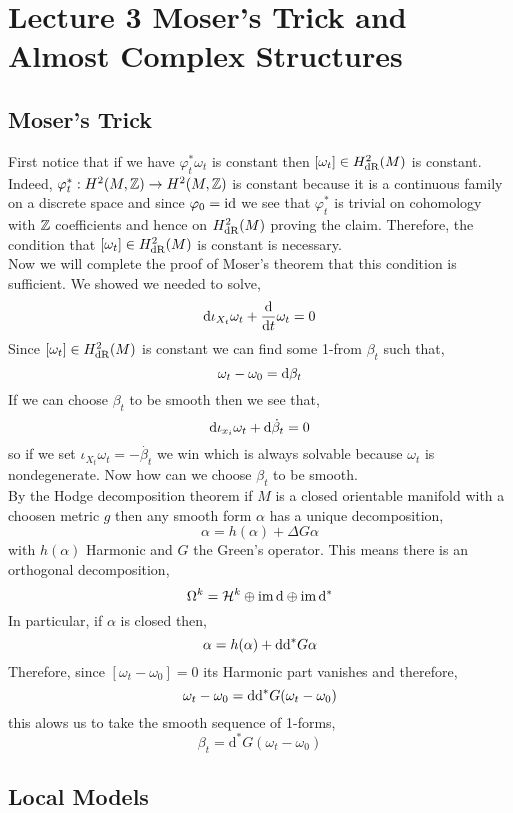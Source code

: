 \documentclass[12pt]{article}
\begin{document}
\section{Lecture 3 Moser's Trick and Almost Complex Structures}

\subsection{Moser's Trick}

First notice that if we have $\varphi^*_t \omega_t$ is constant then $[\omega_t] \in H^2_{\mathrm{dR}}(M)$ is constant. Indeed, $\varphi^*_t : H^2(M,\mathbb{Z}) \to H^2(M,\mathbb{Z})$ is constant because it is a continuous family on a discrete space and since $\varphi_0 = \mathrm{id}$ we see that $\varphi_t^*$ is trivial on cohomology with $\mathbb{Z}$ coefficients and hence on $H^2_{\mathrm{dR}}(M)$ proving the claim. Therefore, the condition that $[\omega_t] \in H^2_{\mathrm{dR}}(M)$ is constant is necessary.  
\bigskip\\
Now we will complete the proof of Moser's theorem that this condition is sufficient. We showed we needed to solve,
\[ \mathrm{d}{\iota_{X_t} \omega_t} + \frac{\mathrm{d}{}}{\mathrm{d}{t}} \omega_t = 0 \]
Since $[\omega_t] \in H^2_{\mathrm{dR}}(M)$ is constant we can find some 1-from $\beta_t$ such that,
\[ \omega_t - \omega_0 = \mathrm{d}{\beta_t} \]
If we can choose $\beta_t$ to be smooth then we see that,
\[ \mathrm{d}{\iota_{x_i} \omega_t} + \mathrm{d}{\dot{\beta}_t} = 0 \]
so if we set $\iota_{X_t} \omega_t = - \dot{\beta_t}$ we win which is always solvable because $\omega_t$ is nondegenerate. Now how can we choose $\beta_t$ to be smooth. 
\bigskip\\
By the Hodge decomposition theorem if $M$ is a closed orientable manifold with a choosen metric $g$ then any smooth form $\alpha$ has a unique decomposition,
\[ \alpha = h(\alpha) + \Delta G \alpha \]
with $h(\alpha)$ Harmonic and $G$ the Green's operator. This means there is an orthogonal decomposition,
\[ \Omega^k = \mathcal{H}^k \oplus \operatorname{\mathrm{im}}{\mathrm{d}{}} \oplus \operatorname{\mathrm{im}}{\mathrm{d}^*} \]
In particular, if $\alpha$ is closed then,
\[ \alpha = h(\alpha) + \mathrm{d}{\mathrm{d}^* G \alpha} \]
Therefore, since $[\omega_t - \omega_0] = 0$ its Harmonic part vanishes and therefore,
\[ \omega_t - \omega_0 = \mathrm{d}{\mathrm{d}^* G (\omega_t - \omega_0)} \] 
this alows us to take the smooth sequence of 1-forms,
\[ \beta_t = \mathrm{d}^* G (\omega_t - \omega_0) \]

\subsection{Local Models}
\end{document}
